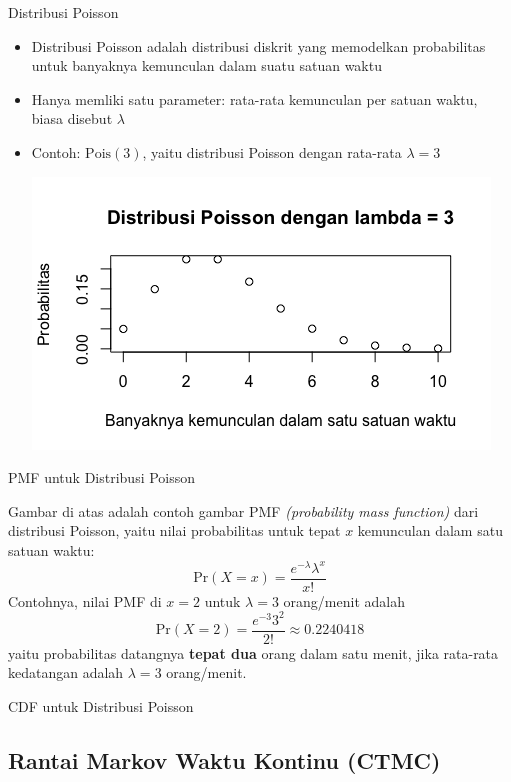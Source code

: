 \documentclass{beamer}
\begin{document}
\begin{frame}{Distribusi Poisson}
    \begin{itemize}
        \item Distribusi Poisson adalah distribusi diskrit yang memodelkan probabilitas untuk banyaknya kemunculan dalam suatu satuan waktu
        \item Hanya memliki satu parameter: rata-rata kemunculan per satuan waktu, biasa disebut \( \lambda \)
        \item Contoh: \( \text{Pois}(3) \), yaitu distribusi Poisson dengan rata-rata \( \lambda = 3 \)

        \includegraphics[scale=0.5]{gambar/dist_pois_lambda3.png}
    \end{itemize}
\end{frame}

\begin{frame}{PMF untuk Distribusi Poisson}

    Gambar di atas adalah contoh gambar PMF \textit{(probability mass function)} dari distribusi Poisson, yaitu nilai probabilitas untuk tepat \(x\) kemunculan dalam satu satuan waktu:
    \[ \text{Pr}(X=x) = \frac{e^{-\lambda} \lambda^x}{x!} \]
    Contohnya, nilai PMF di \(x=2\) untuk \(\lambda = 3\) orang/menit adalah
    \[ \text{Pr}(X=2) = \frac{e^{-3} 3^2}{2!} \approx 0.2240418 \]
    yaitu probabilitas datangnya \textbf{tepat dua} orang dalam satu menit, jika rata-rata kedatangan adalah \(\lambda = 3\) orang/menit.
\end{frame}

\begin{frame}{CDF untuk Distribusi Poisson}
    
\end{frame}

\subsection{Rantai Markov Waktu Kontinu (CTMC)}
\end{document}
